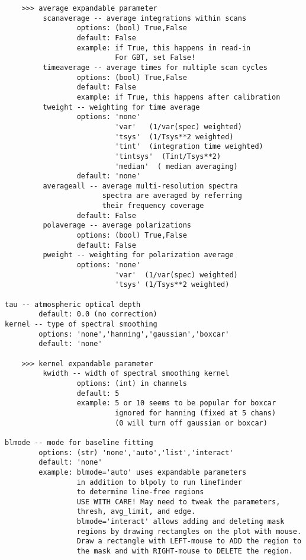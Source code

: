 \begin{verbatim}
    >>> average expandable parameter
         scanaverage -- average integrations within scans
                 options: (bool) True,False
                 default: False
                 example: if True, this happens in read-in
                          For GBT, set False!
         timeaverage -- average times for multiple scan cycles
                 options: (bool) True,False
                 default: False
                 example: if True, this happens after calibration
         tweight -- weighting for time average
                 options: 'none'
                          'var'   (1/var(spec) weighted)
                          'tsys'  (1/Tsys**2 weighted)
                          'tint'  (integration time weighted)
                          'tintsys'  (Tint/Tsys**2)
                          'median'  ( median averaging)
                 default: 'none'
         averageall -- average multi-resolution spectra
                       spectra are averaged by referring 
                       their frequency coverage
                 default: False
         polaverage -- average polarizations
                 options: (bool) True,False
                 default: False
         pweight -- weighting for polarization average
                 options: 'none'
                          'var'  (1/var(spec) weighted)
                          'tsys' (1/Tsys**2 weighted)
                          
tau -- atmospheric optical depth
        default: 0.0 (no correction)
kernel -- type of spectral smoothing
        options: 'none','hanning','gaussian','boxcar'
        default: 'none'
        
    >>> kernel expandable parameter
         kwidth -- width of spectral smoothing kernel
                 options: (int) in channels
                 default: 5
                 example: 5 or 10 seems to be popular for boxcar
                          ignored for hanning (fixed at 5 chans)
                          (0 will turn off gaussian or boxcar)

blmode -- mode for baseline fitting
        options: (str) 'none','auto','list','interact'
        default: 'none'
        example: blmode='auto' uses expandable parameters
                 in addition to blpoly to run linefinder
                 to determine line-free regions
                 USE WITH CARE! May need to tweak the parameters,
                 thresh, avg_limit, and edge.
                 blmode='interact' allows adding and deleting mask 
                 regions by drawing rectangles on the plot with mouse. 
                 Draw a rectangle with LEFT-mouse to ADD the region to 
                 the mask and with RIGHT-mouse to DELETE the region. 


\end{verbatim}
